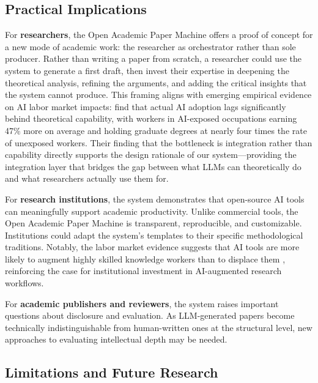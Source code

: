 \documentclass{article}
\begin{document}
\subsection{Practical Implications}

For \textbf{researchers}, the Open Academic Paper Machine offers a proof of concept for a new mode of academic work: the researcher as orchestrator rather than sole producer. Rather than writing a paper from scratch, a researcher could use the system to generate a first draft, then invest their expertise in deepening the theoretical analysis, refining the arguments, and adding the critical insights that the system cannot produce. This framing aligns with emerging empirical evidence on AI labor market impacts: \citet{massenkoff2026labor} find that actual AI adoption lags significantly behind theoretical capability, with workers in AI-exposed occupations earning 47\% more on average and holding graduate degrees at nearly four times the rate of unexposed workers. Their finding that the bottleneck is integration rather than capability directly supports the design rationale of our system---providing the integration layer that bridges the gap between what LLMs can theoretically do and what researchers actually use them for.

For \textbf{research institutions}, the system demonstrates that open-source AI tools can meaningfully support academic productivity. Unlike commercial tools, the Open Academic Paper Machine is transparent, reproducible, and customizable. Institutions could adapt the system's templates to their specific methodological traditions. Notably, the labor market evidence suggests that AI tools are more likely to augment highly skilled knowledge workers than to displace them \citep{massenkoff2026labor}, reinforcing the case for institutional investment in AI-augmented research workflows.

For \textbf{academic publishers and reviewers}, the system raises important questions about disclosure and evaluation. As LLM-generated papers become technically indistinguishable from human-written ones at the structural level, new approaches to evaluating intellectual depth may be needed.

\subsection{Limitations and Future Research}
\end{document}
